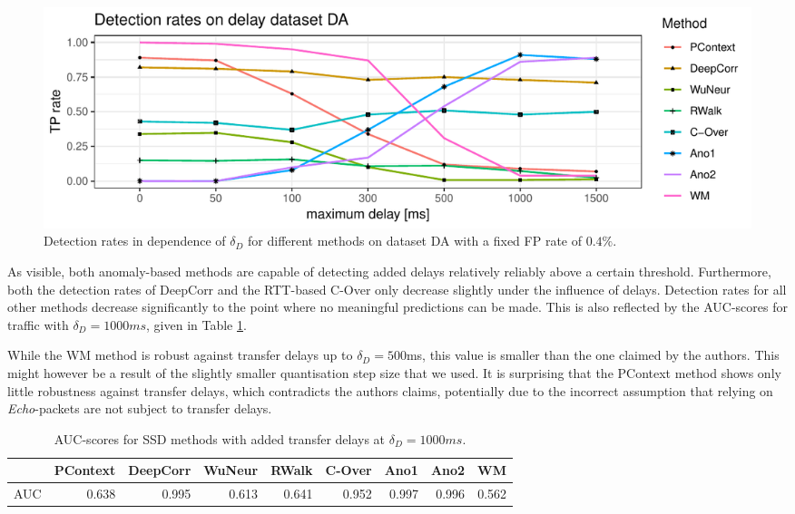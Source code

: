 \documentclass[runningheads,11pt]{llncs}\usepackage[]{graphicx}\usepackage[]{color}
\makeatletter
\def\maxwidth{ %
  \ifdim\Gin@nat@width>\linewidth
    \linewidth
  \else
    \Gin@nat@width
  \fi
}
\newenvironment{knitrout}{}{} %
\makeatother
\begin{document}

\begin{knitrout}
\color{fgcolor}\begin{figure}
\includegraphics[width=\maxwidth]{figure/Delaydetection-1} \caption[Detection rates in dependence of $\delta_D$ for different methods on dataset DA with a fixed FP rate of $0.4\%$]{Detection rates in dependence of $\delta_D$ for different methods on dataset DA with a fixed FP rate of $0.4\%$.}\label{fig:Delaydetection}
\end{figure}


\end{knitrout}

As visible, both anomaly-based methods are capable of detecting added delays relatively reliably above a certain threshold. Furthermore, both the detection rates of DeepCorr and the RTT-based C-Over only decrease slightly under the influence of delays. Detection rates for all other methods decrease significantly to the point where no meaningful predictions can be made. This is also reflected by the AUC-scores for traffic with $\delta_D=1000ms$, given in Table \ref{Tab:AUCdelays}.

While the WM method is robust against transfer delays up to $\delta_D=500$ms, this value is smaller than the one claimed by the authors. This might however be a result of the slightly smaller quantisation step size that we used. It is surprising that the PContext method shows only little robustness against transfer delays, which contradicts the authors claims, potentially due to the incorrect assumption that relying on \textit{Echo}-packets are not subject to transfer delays.


\begin{table}
\centering
\begin{tabular}{l|r|r|r|r|r|r|r|r}
  \hline
 & PContext & DeepCorr & WuNeur & RWalk & C-Over & Ano1 & Ano2 & WM \\ 
  \hline
AUC & 0.638 & 0.995 & 0.613 & 0.641 & 0.952 & 0.997 & 0.996 & 0.562 \\ 
   \hline
\end{tabular}

\caption{AUC-scores for SSD methods with added transfer delays at $\delta_D=1000ms$.}\label{Tab:AUCdelays}
\vspace{-0.6cm}
\end{table}
\end{document}
